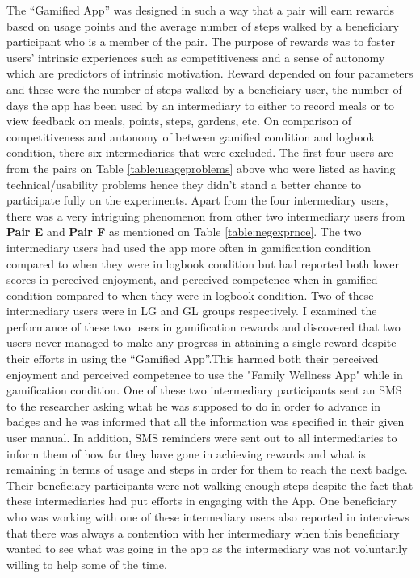 The ``Gamified App'' was designed in such a way that a pair will earn rewards based on usage points and the average number of steps walked by a beneficiary participant who is a member of the pair. The purpose of rewards was to foster users' intrinsic experiences such as competitiveness and a sense of autonomy which are predictors of intrinsic motivation. Reward depended on four parameters and these were the number of steps walked by a beneficiary user, the number of days the app has been used by an intermediary to either to record meals or to view feedback on meals, points, steps, gardens, etc. On comparison of competitiveness and autonomy of between gamified condition and logbook condition, there six intermediaries that were excluded.\newline
The first four users are from the pairs on Table \ref{table:usageproblems} above who were listed as having technical/usability problems hence they didn't stand a better chance to participate fully on the experiments.  Apart from the four intermediary users, there was  a very intriguing phenomenon from other two intermediary users from \textbf{Pair E} and \textbf{Pair F} as mentioned on Table \ref{table:negexprnce}. The two intermediary users had used the app more often in gamification condition  compared to when they were in logbook condition but had reported both lower scores in perceived enjoyment, and perceived competence when in gamified condition compared to when they were in logbook condition. Two of these intermediary users were  in LG and GL groups respectively. I examined the performance of these two users in gamification rewards and discovered that two users never managed to make any progress in attaining a single reward despite their efforts in using the ``Gamified App''.This harmed both their perceived enjoyment and perceived competence to use the "Family Wellness App" while in gamification condition. One of these two intermediary participants sent an SMS to the researcher asking what he was supposed to do in order to advance in badges and he was informed that all the information was specified in their given user manual. In addition, SMS reminders were sent out to all intermediaries to inform them of how far they have gone in achieving rewards and what is remaining in terms of usage and steps in order for them to reach the next badge. Their beneficiary participants were not walking enough steps despite the fact that these intermediaries had put  efforts in engaging with the App. One beneficiary who was working with one of these intermediary users also reported in interviews that there was always a contention with her intermediary when this beneficiary wanted to see what was going in the app as the intermediary was not voluntarily willing to help some of the time.\newline
